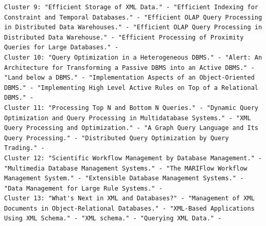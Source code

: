 \documentclass[a4paper,fontsize=11pt]{article}
\begin{document}
\begin{lstlisting}[caption={KMeans output},label={lst:output},breaklines]
Cluster 9: "Efficient Storage of XML Data." - "Efficient Indexing for Constraint and Temporal Databases." - "Efficient OLAP Query Processing in Distributed Data Warehouses." - "Efficient OLAP Query Processing in Distributed Data Warehouse." - "Efficient Processing of Proximity Queries for Large Databases." - 
Cluster 10: "Query Optimization in a Heterogeneous DBMS." - "Alert: An Architecture for Transforming a Passive DBMS into an Active DBMS." - "Land below a DBMS." - "Implementation Aspects of an Object-Oriented DBMS." - "Implementing High Level Active Rules on Top of a Relational DBMS." - 
Cluster 11: "Processing Top N and Bottom N Queries." - "Dynamic Query Optimization and Query Processing in Multidatabase Systems." - "XML Query Processing and Optimization." - "A Graph Query Language and Its Query Processing." - "Distributed Query Optimization by Query Trading." - 
Cluster 12: "Scientific Workflow Management by Database Management." - "Multimedia Database Management Systems." - "The MARIFlow Workflow Management System." - "Extensible Database Management Systems." - "Data Management for Large Rule Systems." - 
Cluster 13: "What's Next in XML and Databases?" - "Management of XML Documents in Object-Relational Databases." - "XML-Based Applications Using XML Schema." - "XML schema." - "Querying XML Data." - 



\end{lstlisting}
\end{document}
